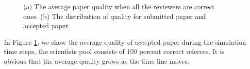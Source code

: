 \documentclass[11pt]{article}
\begin{document}
\begin{figure}[H]
    \centering
    \qquad
    \caption{(a) The average paper quality when all the reviewers are correct ones. (b) The distribution of quality for submitted paper and accepted paper.}
    \label{fig:t1}
\end{figure}

In Figure \ref{fig:t1}, we show the average quality of accepted paper during the simulation time steps, the scientists pool consists of 100 percent correct referees. It is obvious that the average quality grows as the time line moves.
\end{document}
